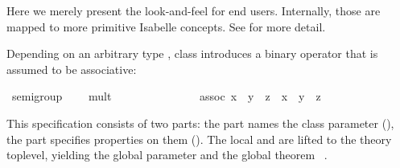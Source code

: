 \begin{isabellebody}
\begin{isamarkuptext}
  Here we merely present the look-and-feel for end users.
  Internally, those are mapped to more primitive Isabelle concepts.
  See \cite{Haftmann-Wenzel:2006:classes} for more detail.%
\end{isamarkuptext}%
\isamarkuptrue%
%
\isamarkuptrue%
%
\isamarkuptrue%
%
\begin{isamarkuptext}%
Depending on an arbitrary type \isa{{\isasymalpha}}, class  introduces a binary operator \isa{{\isacharparenleft}{\isasymotimes}{\isacharparenright}} that is
  assumed to be associative:%
\end{isamarkuptext}%
\isamarkuptrue%
%
\isadelimquote
%
\endisadelimquote
%
\isatagquote
{}\isamarkupfalse%
\ semigroup\ {\isacharequal}\isanewline
\ \ \ mult\ {\isacharcolon}{\isacharcolon}\ {\isachardoublequoteopen}{\isasymalpha}\ {\isasymRightarrow}\ {\isasymalpha}\ {\isasymRightarrow}\ {\isasymalpha}{\isachardoublequoteclose}\ \ \ \ {\isacharparenleft}\ {\isachardoublequoteopen}{\isasymotimes}{\isachardoublequoteclose}\ {}{}{\isacharparenright}\isanewline
\ \ \ assoc{\isacharcolon}\ {\isachardoublequoteopen}{\isacharparenleft}x\ {\isasymotimes}\ y{\isacharparenright}\ {\isasymotimes}\ z\ {\isacharequal}\ x\ {\isasymotimes}\ {\isacharparenleft}y\ {\isasymotimes}\ z{\isacharparenright}{\isachardoublequoteclose}%
\endisatagquote
{\isafoldquote}%
%
\isadelimquote
%
\endisadelimquote
%
\begin{isamarkuptext}%
\noindent This \hyperlink{command.class}{\mbox{}} specification consists of two
  parts: the  part names the class parameter
  (\hyperlink{element.fixes}{\mbox{}}), the  part specifies properties on them
  (\hyperlink{element.assumes}{\mbox{}}).  The local \hyperlink{element.fixes}{\mbox{}} and
  \hyperlink{element.assumes}{\mbox{}} are lifted to the theory toplevel,
  yielding the global
  parameter  and the
  global theorem \hyperlink{fact.semigroup.assoc:}{\mbox{}}~.%

\end{isamarkuptext}
\end{isabellebody}
